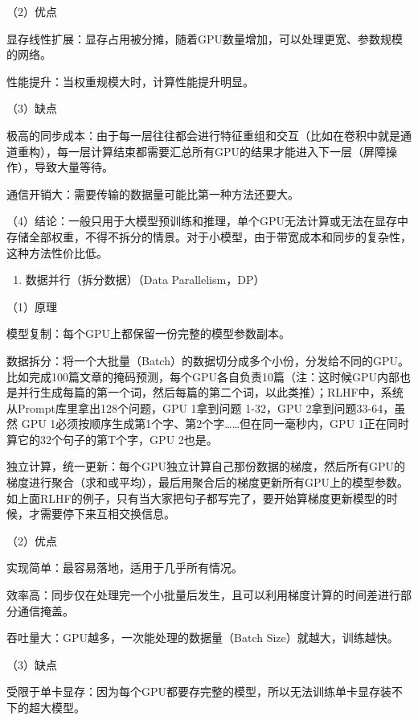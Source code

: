 （2）优点

显存线性扩展：显存占用被分摊，随着GPU数量增加，可以处理更宽、参数规模的网络。

性能提升：当权重规模大时，计算性能提升明显。

（3）缺点

极高的同步成本：由于每一层往往都会进行特征重组和交互（比如在卷积中就是通道重构），每一层计算结束都需要汇总所有GPU的结果才能进入下一层（屏障操作），导致大量等待。

通信开销大：需要传输的数据量可能比第一种方法还要大。

（4）结论：一般只用于大模型预训练和推理，单个GPU无法计算或无法在显存中存储全部权重，不得不拆分的情景。对于小模型，由于带宽成本和同步的复杂性，这种方法性价比低。

\begin{enumerate}
\def\labelenumi{\arabic{enumi}.}
\setcounter{enumi}{2}
\tightlist
\item
  数据并行（拆分数据）（Data Parallelism，DP）
\end{enumerate}

（1）原理

模型复制：每个GPU上都保留一份完整的模型参数副本。

数据拆分：将一个大批量（Batch）的数据切分成多个小份，分发给不同的GPU。比如完成100篇文章的掩码预测，每个GPU各自负责10篇（注：这时候GPU内部也是并行生成每篇的第一个词，然后每篇的第二个词，以此类推）；RLHF中，系统从Prompt库里拿出128个问题，GPU 1拿到问题 1-32，GPU 2拿到问题33-64，虽然 GPU 1必须按顺序生成第1个字、第2个字\ldots\ldots 但在同一毫秒内，GPU 1正在同时算它的32个句子的第T个字，GPU 2也是。

独立计算，统一更新：每个GPU独立计算自己那份数据的梯度，然后所有GPU的梯度进行聚合（求和或平均），最后用聚合后的梯度更新所有GPU上的模型参数。如上面RLHF的例子，只有当大家把句子都写完了，要开始算梯度更新模型的时候，才需要停下来互相交换信息。

（2）优点

实现简单：最容易落地，适用于几乎所有情况。

效率高：同步仅在处理完一个小批量后发生，且可以利用梯度计算的时间差进行部分通信掩盖。

吞吐量大：GPU越多，一次能处理的数据量（Batch Size）就越大，训练越快。

（3）缺点

受限于单卡显存：因为每个GPU都要存完整的模型，所以无法训练单卡显存装不下的超大模型。

